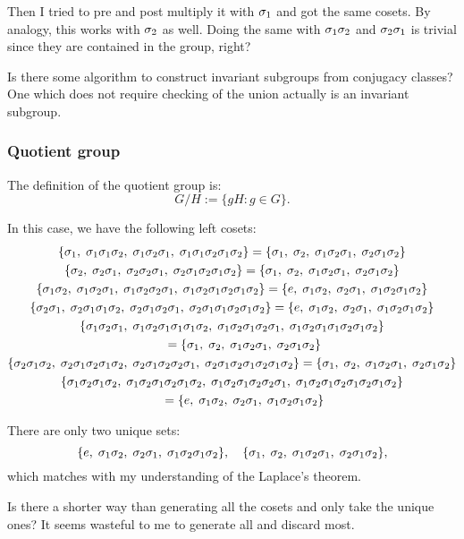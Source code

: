 \documentclass[11pt, english, fleqn, DIV=15, headinclude, BCOR=1cm]{scrartcl}
\begin{document}
Then I tried to pre and post multiply it with $\1$ and got the same cosets. By
analogy, this works with $\2$ as well. Doing the same with $\1\2$ and $\2\1$ is
trivial since they are contained in the group, right?

\begin{question}
    Is there some algorithm to construct invariant subgroups from conjugacy
    classes? One which does not require checking of the union actually is an
    invariant subgroup.
\end{question}

\subsubsection{Quotient group}

The definition of the quotient group is:
\[
    G / H := \{ gH \colon g \in G \}.
\]

In this case, we have the following left cosets:
\begin{gather*}
    \{ \1\ssep \1\1\2\ssep \1\2\1\ssep \1\1\2\1\2 \} = \{ \1\ssep \2\ssep \1\2\1\ssep \2\1\2 \} \\
    \{ \2\ssep \2\1\ssep \2\2\1\ssep \2\1\2\1\2 \} = \{ \1\ssep \2\ssep \1\2\1\ssep \2\1\2 \} \\
    \{ \1\2\ssep \1\2\1\ssep \1\2\2\1\ssep \1\2\1\2\1\2 \} = \{ e\ssep \1\2\ssep \2\1\ssep \1\2\1\2 \}
    \\
    \{ \2\1\ssep \2\1\1\2\ssep \2\1\2\1\ssep \2\1\1\2\1\2 \} = \{ e\ssep \1\2\ssep \2\1\ssep \1\2\1\2 \}
    \\
    \{ \1\2\1\ssep \1\2\1\1\1\2\ssep \1\2\1\2\1\ssep \1\2\1\1\2\1\2 \} \\ \qquad = \{ \1\ssep \2\ssep \1\2\1\ssep
    \2\1\2 \} \\
    \{ \2\1\2\ssep \2\1\2\1\2\ssep \2\1\2\2\1\ssep \2\1\2\1\2\1\2 \} = \{ \1\ssep \2\ssep \1\2\1\ssep
    \2\1\2 \} \\
    \{ \1\2\1\2\ssep \1\2\1\2\1\2\ssep \1\2\1\2\2\1\ssep \1\2\1\2\1\2\1\2 \} \\ \qquad = \{ e\ssep \1\2\ssep
    \2\1\ssep \1\2\1\2 \}
\end{gather*}

There are only two unique sets:
\[
    \{ e\ssep \1\2\ssep \2\1\ssep \1\2\1\2 \}
    \eqnsep
    \{ \1\ssep \2\ssep \1\2\1\ssep \2\1\2 \},
\]
which matches with my understanding of the Laplace's theorem.

\begin{question}
    Is there a shorter way than generating all the cosets and only take the
    unique ones? It seems wasteful to me to generate all and discard most.
\end{question}
\end{document}
